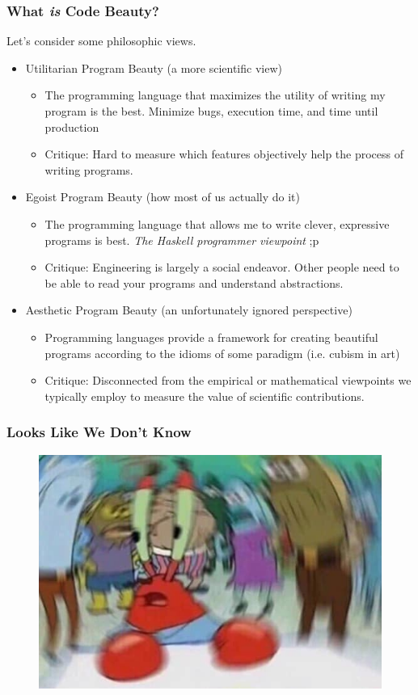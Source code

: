 \documentclass{beamer}
\begin{document}
\begin{frame}
  \frametitle{What \emph{is} Code Beauty?}
  Let's consider some philosophic views.
  \begin{itemize}
  \item<1-> Utilitarian Program Beauty (a more scientific view)
    \begin{itemize}
    \item<2-> The programming language that maximizes the utility of writing my program is the best. Minimize bugs, execution time, and time until production
    \item<3-> Critique: Hard to measure which features objectively help the process of writing programs.
    \end{itemize}
  \item<4-> Egoist Program Beauty (how most of us actually do it)
    \begin{itemize}
    \item<5-> The programming language that allows me to write clever, expressive programs is best. \emph{The Haskell programmer viewpoint} ;p
    \item<6-> Critique: Engineering is largely a social endeavor. Other people need to be able to read your programs and understand abstractions.
    \end{itemize}
  \item<7-> Aesthetic Program Beauty (an unfortunately ignored perspective)
    \begin{itemize}
    \item<8-> Programming languages provide a framework for creating beautiful programs according to the idioms of some paradigm (i.e. cubism in art)
    \item<9-> Critique: Disconnected from the empirical or mathematical viewpoints we typically employ to measure the value of scientific contributions. 
    \end{itemize}
  \end{itemize}
\end{frame}

\begin{frame}
  \frametitle{Looks Like We Don't Know}
  \begin{figure}
    \centering
    \includegraphics[width=.7\textwidth]{images/mr-krabs.jpeg}
  \end{figure}
\end{frame}
\end{document}

